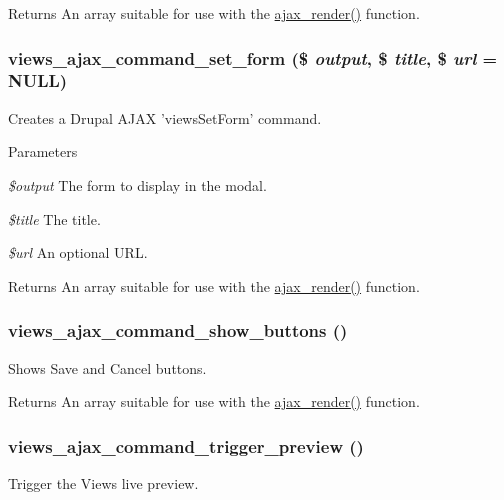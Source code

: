 \begin{DoxyReturn}{Returns}
An array suitable for use with the \hyperlink{group__ajax_ga241c2426bdde049c55b05b7bf5d714a2}{ajax\_\-render()} function. 
\end{DoxyReturn}
\hypertarget{group__ajax_gac5062864272f5b8134072eb22a661e6f}{
\subsubsection[{views\_\-ajax\_\-command\_\-set\_\-form}]{\setlength{\rightskip}{0pt plus 5cm}views\_\-ajax\_\-command\_\-set\_\-form (\$ {\em output}, \/  \$ {\em title}, \/  \$ {\em url} = {\ttfamily NULL})}}
\label{group__ajax_gac5062864272f5b8134072eb22a661e6f}
Creates a Drupal AJAX 'viewsSetForm' command.


\begin{DoxyParams}{Parameters}
\item[{\em \$output}]The form to display in the modal. \item[{\em \$title}]The title. \item[{\em \$url}]An optional URL.\end{DoxyParams}
\begin{DoxyReturn}{Returns}
An array suitable for use with the \hyperlink{group__ajax_ga241c2426bdde049c55b05b7bf5d714a2}{ajax\_\-render()} function. 
\end{DoxyReturn}
\hypertarget{group__ajax_ga3ef672bfe39df163a3cf89ed23c8a0c2}{
\subsubsection[{views\_\-ajax\_\-command\_\-show\_\-buttons}]{\setlength{\rightskip}{0pt plus 5cm}views\_\-ajax\_\-command\_\-show\_\-buttons ()}}
\label{group__ajax_ga3ef672bfe39df163a3cf89ed23c8a0c2}
Shows Save and Cancel buttons.

\begin{DoxyReturn}{Returns}
An array suitable for use with the \hyperlink{group__ajax_ga241c2426bdde049c55b05b7bf5d714a2}{ajax\_\-render()} function. 
\end{DoxyReturn}
\hypertarget{group__ajax_ga698e1518b153b16adbe61e3aeb376eac}{
\subsubsection[{views\_\-ajax\_\-command\_\-trigger\_\-preview}]{\setlength{\rightskip}{0pt plus 5cm}views\_\-ajax\_\-command\_\-trigger\_\-preview ()}}
\label{group__ajax_ga698e1518b153b16adbe61e3aeb376eac}
Trigger the Views live preview.

